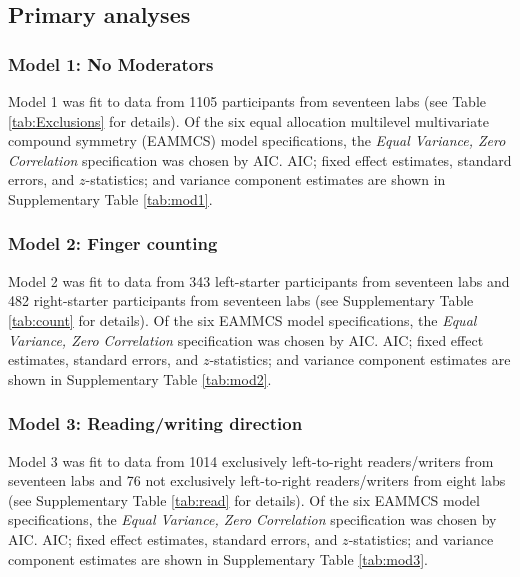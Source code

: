 \documentclass[A4paper,man,floatsintext]{apa6}
\theoremstyle{definition}
\theoremstyle{definition}
\theoremstyle{definition}
\theoremstyle{remark}
\begin{document}
\printbibliography[title=References]

\clearpage
\makeatletter
\efloat@restorefloats
\makeatother


\begin{appendix}
\section{}
\subsection{Primary analyses}\label{primary-analyses}

\subsubsection{Model 1: No Moderators}\label{model-1-no-moderators}

Model 1 was fit to data from 1105 participants from seventeen labs (see
Table \ref{tab:Exclusions} for details). Of the six equal allocation
multilevel multivariate compound symmetry (EAMMCS) model specifications,
the \emph{Equal Variance, Zero Correlation} specification was chosen by
AIC. AIC; fixed effect estimates, standard errors, and \(z\)-statistics;
and variance component estimates are shown in Supplementary Table
\ref{tab:mod1}.

\subsubsection{Model 2: Finger counting}\label{model-2-finger-counting}

Model 2 was fit to data from 343 left-starter participants from
seventeen labs and 482 right-starter participants from seventeen labs
(see Supplementary Table \ref{tab:count} for details). Of the six EAMMCS
model specifications, the \emph{Equal Variance, Zero Correlation}
specification was chosen by AIC. AIC; fixed effect estimates, standard
errors, and \(z\)-statistics; and variance component estimates are shown
in Supplementary Table \ref{tab:mod2}.

\subsubsection{Model 3: Reading/writing
direction}\label{model-3-readingwriting-direction}

Model 3 was fit to data from 1014 exclusively left-to-right
readers/writers from seventeen labs and 76 not exclusively left-to-right
readers/writers from eight labs (see Supplementary Table \ref{tab:read}
for details). Of the six EAMMCS model specifications, the \emph{Equal
Variance, Zero Correlation} specification was chosen by AIC. AIC; fixed
effect estimates, standard errors, and \(z\)-statistics; and variance
component estimates are shown in Supplementary Table \ref{tab:mod3}.


\end{appendix}
\end{document}
